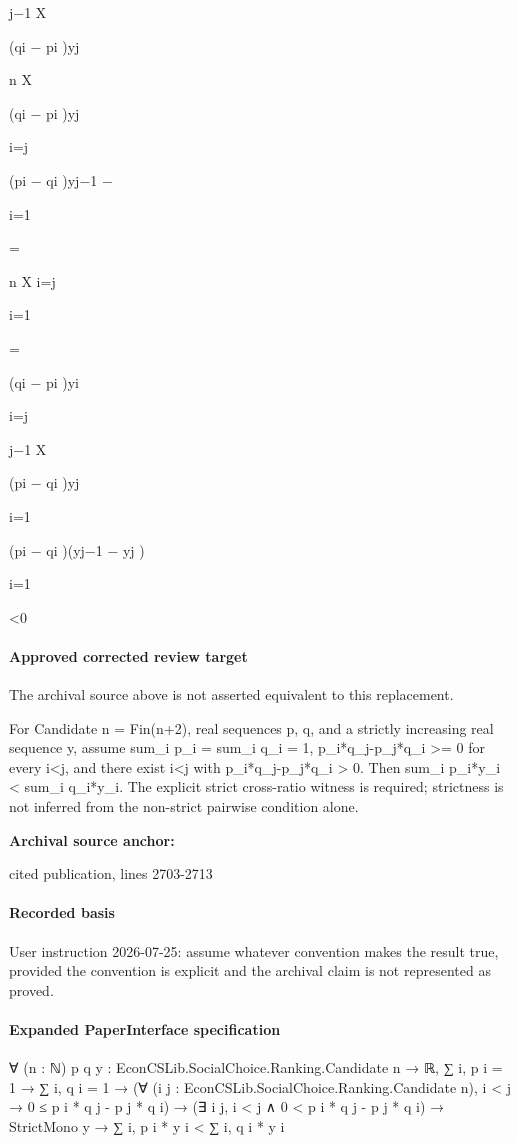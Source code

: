 \documentclass[10pt]{article}
\begin{document}
\begin{ReviewVerbatim}
j−1
X

(qi − pi )yj

n
X

(qi − pi )yj

i=j

(pi − qi )yj−1 −

i=1

=

n
X
i=j

i=1

=

(qi − pi )yi

i=j

j−1
X

(pi − qi )yj

i=1

(pi − qi )(yj−1 − yj )

i=1

<0
\end{ReviewVerbatim}

\paragraph{Approved corrected review target}
The archival source above is not asserted equivalent to this replacement.
\begin{ReviewVerbatim}
For Candidate n = Fin(n+2), real sequences p, q, and a strictly increasing real sequence y, assume sum_i p_i = sum_i q_i = 1, p_i*q_j-p_j*q_i >= 0 for every i<j, and there exist i<j with p_i*q_j-p_j*q_i > 0. Then sum_i p_i*y_i < sum_i q_i*y_i. The explicit strict cross-ratio witness is required; strictness is not inferred from the non-strict pairwise condition alone.
\end{ReviewVerbatim}

\textbf{Archival source anchor:} {\footnotesize\raggedright cited publication, lines 2703-\allowbreak{}2713\par}
\paragraph{Recorded basis}
User instruction 2026-\allowbreak{}07-\allowbreak{}25:\allowbreak{} assume whatever convention makes the result true, provided the convention is explicit and the archival claim is not represented as proved.\allowbreak{}
\paragraph{Expanded PaperInterface specification}
\begin{ReviewVerbatim}
∀ (n : ℕ) {p q y : EconCSLib.SocialChoice.Ranking.Candidate n → ℝ},
  ∑ i, p i = 1 →
    ∑ i, q i = 1 →
      (∀ (i j : EconCSLib.SocialChoice.Ranking.Candidate n), i < j → 0 ≤ p i * q j - p j * q i) →
        (∃ i j, i < j ∧ 0 < p i * q j - p j * q i) → StrictMono y → ∑ i, p i * y i < ∑ i, q i * y i
\end{ReviewVerbatim}
\end{document}
